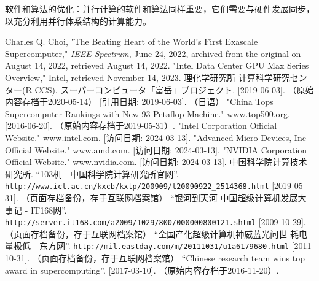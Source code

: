 \documentclass{ctexart}
\begin{document}
软件和算法的优化：并行计算的软件和算法同样重要，它们需要与硬件发展同步，以充分利用并行体系结构的计算能力。
\begin{thebibliography}{99}
Charles Q. Choi, "The Beating Heart of the World's First Exascale Supercomputer," \textit{IEEE Spectrum}, June 24, 2022, archived from the original on August 14, 2022, retrieved August 14, 2022.
"Intel Data Center GPU Max Series Overview," Intel, retrieved November 14, 2023.
理化学研究所 计算科学研究センター(R-CCS). スーパーコンピュータ「富岳」プロジェクト. [2019-06-03]. （原始内容存档于2020-05-14） [引用日期: 2019-06-03]. （日语）
"China Tops Supercomputer Rankings with New 93-Petaflop Machine." www.top500.org. [2016-06-20]. （原始内容存档于2019-05-31）.
"Intel Corporation Official Website." www.intel.com. [访问日期: 2024-03-13].
"Advanced Micro Devices, Inc Official Website." www.amd.com. [访问日期: 2024-03-13].
"NVIDIA Corporation Official Website." www.nvidia.com. [访问日期: 2024-03-13].
中国科学院计算技术研究所. ``103机 - 中国科学院计算研究所官网''. \texttt{http://www.ict.ac.cn/kxcb/kxtp/200909/t20090922\_2514368.html} [2019-05-31]. （页面存档备份，存于互联网档案馆）
``银河到天河 中国超级计算机发展大事记 - IT168网''. \texttt{http://server.it168.com/a2009/1029/800/000000800121.shtml} [2009-10-29]. （页面存档备份，存于互联网档案馆）
``全国产化超级计算机神威蓝光问世 耗电量极低 - 东方网''. \texttt{http://mil.eastday.com/m/20111031/u1a6179680.html} [2011-10-31]. （页面存档备份，存于互联网档案馆）
``Chinese research team wins top award in supercomputing''. [2017-03-10]. （原始内容存档于2016-11-20）.
\end{thebibliography}
\end{document}
